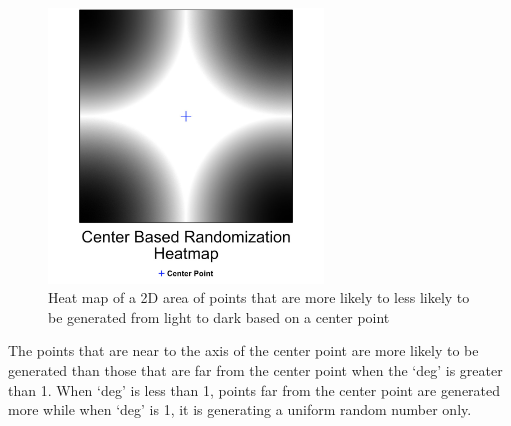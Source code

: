 \begin{figure}[h]
\begin{center}
\includegraphics[width=0.65\textwidth]{img/cbr-map}
\caption{Heat map of a 2D area of points that are more likely to less likely to be generated from light to dark based on a center point}
\end{center}
\end{figure}

\par The points that are near to the axis of the center point are more likely to be generated than those that are far from the center point when the `deg' is greater than 1. When `deg' is less than 1, points far from the center point are generated more while when `deg' is 1, it is generating a uniform random number only.
